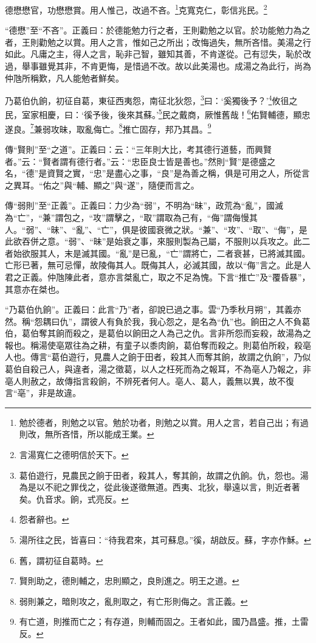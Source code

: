 德懋懋官，功懋懋賞。用人惟己，改過不吝。\footnote{勉於德者，則勉之以官。勉於功者，則勉之以賞。用人之言，若自己出；有過則改，無所吝惜，所以能成王業。}克寬克仁，彰信兆民。\footnote{言湯寬仁之德明信於天下。}

{\noindent\shu{}\fzkt “德懋”至“不吝”。正義曰：於德能勉力行之者，王則勸勉之以官。於功能勉力為之者，王則勸勉之以賞。用人之言，惟如己之所出；改悔過失，無所吝惜。美湯之行如此。凡庸之主，得人之言，恥非己智，雖知其善，不肯遂從。己有愆失，恥於改過，舉事雖覺其非，不肯更悔，是惜過不改。故以此美湯也。成湯之為此行，尚為仲虺所稱歎，凡人能勉者鮮矣。 \par}

乃葛伯仇餉，初征自葛，東征西夷怨，南征北狄怨，\footnote{葛伯遊行，見農民之餉于田者，殺其人，奪其餉，故謂之仇餉。仇，怨也。湯為是以不祀之罪伐之，從此後遂徵無道。西夷、北狄，舉遠以言，則近者著矣。仇音求。餉，式亮反。}曰：‘奚獨後予？’\footnote{怨者辭也。}攸徂之民，室家相慶，曰：‘徯予後，後來其蘇。’\footnote{湯所往之民，皆喜曰：“待我君來，其可蘇息。”徯，胡啟反。蘇，字亦作穌。}民之戴商，厥惟舊哉！\footnote{舊，謂初征自葛時。}佑賢輔德，顯忠遂良。\footnote{賢則助之，德則輔之，忠則顯之，良則進之。明王之道。}兼弱攻昧，取亂侮亡。\footnote{弱則兼之，暗則攻之，亂則取之，有亡形則侮之。言正義。}推亡固存，邦乃其昌。\footnote{有亡道，則推而亡之；有存道，則輔而固之。王者如此，國乃昌盛。推，土雷反。}

{\noindent\zhuan{}\fzbyks 傳“賢則”至“之道”。正義曰：云：“三年則大比，考其德行道藝，而興賢者。”云：“賢者謂有德行者。”云：“忠臣良士皆是善也。”然則“賢”是德盛之名，“德”是資賢之實，“忠”是盡心之事，“良”是為善之稱，俱是可用之人，所從言之異耳。“佑之”與“輔、顯之”與“遂”，隨便而言之。 \par}

{\noindent\zhuan{}\fzbyks 傳“弱則”至“正義”。正義曰：力少為“弱”，不明為“昧”，政荒為“亂”，國滅為“亡”，“兼”謂包之，“攻”謂擊之，“取”謂取為己有，“侮”謂侮慢其人。“弱”、“昧”、“亂”、“亡”，俱是彼國衰微之狀。“兼”、“攻”、“取”、“侮”，是此欲吞併之意。“弱”、“昧”是始衰之事，來服則製為己屬，不服則以兵攻之。此二者始欲服其人，末是滅其國。“亂”是已亂，“亡”謂將亡，二者衰甚，已將滅其國。亡形已著，無可忌憚，故陵侮其人。既侮其人，必滅其國，故以“侮”言之。此是人君之正義。仲虺陳此者，意亦言桀亂亡，取之不足為愧。下言“推亡”及“覆昏暴”，其意亦在桀也。 \par}

{\noindent\shu{}\fzkt “乃葛伯仇餉”。正義曰：此言“乃”者，卻說已過之事。雲“乃季秋月朔”，其義亦然。稱“怨耦曰仇”，謂彼人有負於我，我心怨之，是名為“仇”也。餉田之人不負葛伯，葛伯奪其餉而殺之，是葛伯以餉田之人為己之仇。言非所怨而妄殺，故湯為之報也。稱湯使亳眾往為之耕，有童子以黍肉餉，葛伯奪而殺之。則葛伯所殺，殺亳人也。傳言“葛伯遊行，見農人之餉于田者，殺其人而奪其餉，故謂之仇餉”，乃似葛伯自殺己人，與違者，湯之徵葛，以人之枉死而為之報耳，不為亳人乃報之，非亳人則赦之，故傳指言殺餉，不辨死者何人。亳人、葛人，義無以異，故不復言“亳”，非是故違。 \par}

